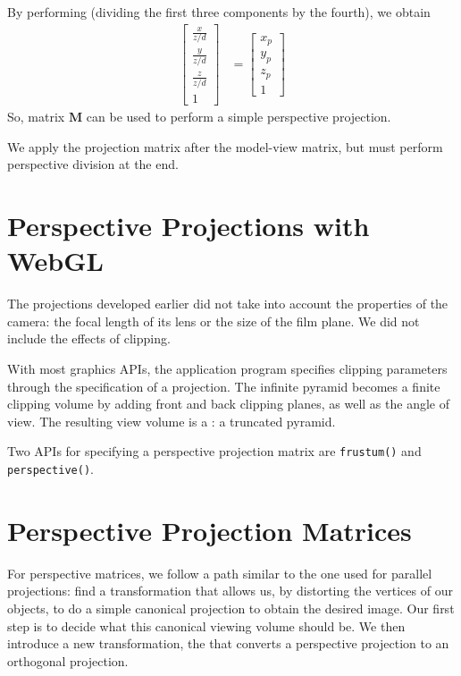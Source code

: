 \documentclass[../COS3712_Notes.tex]{subfiles}
\begin{document}
      By performing 
      (dividing the first three components by the fourth),
      we obtain
      \begin{align*}
        \begin{bmatrix}
          \frac{x}{z/d} \\
          \frac{y}{z/d} \\
          \frac{z}{z/d} \\
          1
        \end{bmatrix} &=
        \begin{bmatrix}
          x_p \\
          y_p \\
          z_p \\
          1
        \end{bmatrix}
      \end{align*}
      So, matrix $\mathbf{M}$ can be used to perform a simple perspective projection.

      We apply the projection matrix after the model-view matrix, but must perform
      perspective division at the end.

    \section{Perspective Projections with WebGL}
      The projections developed earlier did not take into account the properties of the camera:
      the focal length of its lens or the size of the film plane.
      We did not include the effects of clipping.

      With most graphics APIs, the application program specifies clipping parameters through the
      specification of a projection.
      The infinite pyramid becomes a finite clipping volume by adding front and back clipping
      planes, as well as the angle of view.
      The resulting view volume is a : a truncated pyramid.

      Two APIs for specifying a perspective projection matrix are \texttt{frustum()}
      and \texttt{perspective()}.

    \section{Perspective Projection Matrices}
      For perspective matrices, we follow a path similar to the one used for parallel projections:
      find a transformation that allows us, by distorting the vertices of our objects,
      to do a simple canonical projection to obtain the desired image.
      Our first step is to decide what this canonical viewing volume should be.
      We then introduce a new transformation, the 
      that converts a perspective projection to an orthogonal projection.
\end{document}

